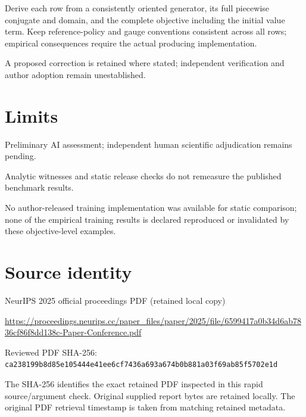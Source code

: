 \documentclass[11pt]{article}
\begin{document}
Derive each row from a consistently oriented generator, its full piecewise conjugate and domain, and the complete objective including the initial value term. Keep reference-policy and gauge conventions consistent across all rows; empirical consequences require the actual producing implementation.

A proposed correction is retained where stated; independent verification and author adoption remain unestablished.

\section*{Limits}

Preliminary AI assessment; independent human scientific adjudication remains pending.\par

Analytic witnesses and static release checks do not remeasure the published benchmark results.\par

No author-released training implementation was available for static comparison; none of the empirical training results is declared reproduced or invalidated by these objective-level examples.\par

\section*{Source identity}

NeurIPS 2025 official proceedings PDF (retained local copy)

\url{https://proceedings.neurips.cc/paper_files/paper/2025/file/6599417a0b34d6ab7836cf86f8dd138c-Paper-Conference.pdf}

Reviewed PDF SHA-256: \nolinkurl{ca238199b8d85e105444e41ee6cf7436a693a674b0b881a03f69ab85f5702e1d}

The SHA-256 identifies the exact retained PDF inspected in this rapid source/argument check. Original supplied report bytes are retained locally. The original PDF retrieval timestamp is taken from matching retained metadata.
\end{document}
